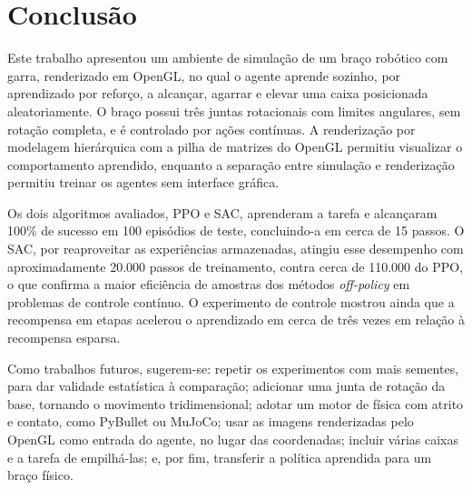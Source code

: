 \section{Conclusão}

Este trabalho apresentou um ambiente de simulação de um braço robótico com garra, renderizado em OpenGL, no qual o agente aprende sozinho, por aprendizado por reforço, a alcançar, agarrar e elevar uma caixa posicionada aleatoriamente. O braço possui três juntas rotacionais com limites angulares, sem rotação completa, e é controlado por ações contínuas. A renderização por modelagem hierárquica com a pilha de matrizes do OpenGL permitiu visualizar o comportamento aprendido, enquanto a separação entre simulação e renderização permitiu treinar os agentes sem interface gráfica.

Os dois algoritmos avaliados, PPO e SAC, aprenderam a tarefa e alcançaram 100\% de sucesso em 100 episódios de teste, concluindo-a em cerca de 15 passos. O SAC, por reaproveitar as experiências armazenadas, atingiu esse desempenho com aproximadamente 20.000 passos de treinamento, contra cerca de 110.000 do PPO, o que confirma a maior eficiência de amostras dos métodos \textit{off-policy} em problemas de controle contínuo. O experimento de controle mostrou ainda que a recompensa em etapas acelerou o aprendizado em cerca de três vezes em relação à recompensa esparsa.

Como trabalhos futuros, sugerem-se: repetir os experimentos com mais sementes, para dar validade estatística à comparação; adicionar uma junta de rotação da base, tornando o movimento tridimensional; adotar um motor de física com atrito e contato, como PyBullet ou MuJoCo; usar as imagens renderizadas pelo OpenGL como entrada do agente, no lugar das coordenadas; incluir várias caixas e a tarefa de empilhá-las; e, por fim, transferir a política aprendida para um braço físico.
